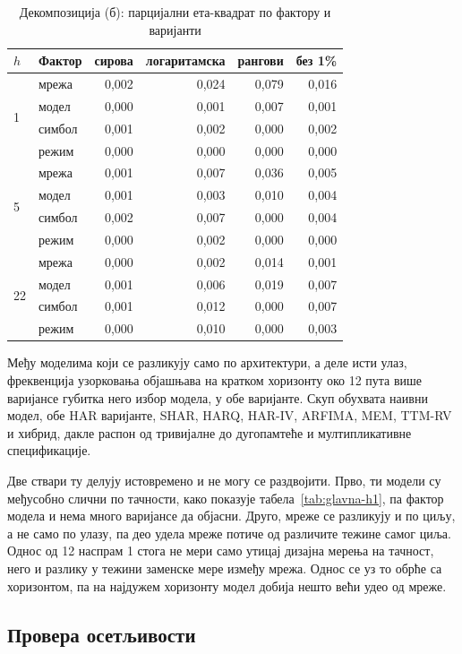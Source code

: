 \begin{table}[htbp]
\centering
\caption{Декомпозиција (б): парцијални ета-квадрат по фактору и варијанти}
\label{tab:anova-b}
\begin{tabular}{llrrrr}
\toprule
$h$ & Фактор & сирова & логаритамска & рангови & без 1\% \\
\midrule
\multirow{4}{*}{1}
& мрежа  & 0,002 & 0,024 & 0,079 & 0,016 \\
& модел  & 0,000 & 0,001 & 0,007 & 0,001 \\
& симбол & 0,001 & 0,002 & 0,000 & 0,002 \\
& режим  & 0,000 & 0,000 & 0,000 & 0,000 \\
\midrule
\multirow{4}{*}{5}
& мрежа  & 0,001 & 0,007 & 0,036 & 0,005 \\
& модел  & 0,001 & 0,003 & 0,010 & 0,004 \\
& симбол & 0,002 & 0,007 & 0,000 & 0,004 \\
& режим  & 0,000 & 0,002 & 0,000 & 0,000 \\
\midrule
\multirow{4}{*}{22}
& мрежа  & 0,000 & 0,002 & 0,014 & 0,001 \\
& модел  & 0,001 & 0,006 & 0,019 & 0,007 \\
& симбол & 0,001 & 0,012 & 0,000 & 0,007 \\
& режим  & 0,000 & 0,010 & 0,000 & 0,003 \\
\bottomrule
\end{tabular}
\end{table}

Међу моделима који се разликују само по архитектури, а деле исти улаз, фреквенција
узорковања објашњава на кратком хоризонту око 12 пута више варијансе губитка него
избор модела, у обе варијанте. Скуп обухвата наивни модел, обе HAR варијанте, SHAR,
HARQ, HAR-IV, ARFIMA, MEM, TTM-RV и хибрид, дакле распон од тривијалне до дугопамтеће и
мултипликативне спецификације.

Две ствари ту делују истовремено и не могу се раздвојити. Прво, ти модели су међусобно
слични по тачности, како показује табела~\ref{tab:glavna-h1}, па фактор модела и нема
много варијансе да објасни. Друго, мреже се разликују и по циљу, а не само по улазу, па
део удела мреже потиче од различите тежине самог циља. Однос од 12 наспрам 1
стога не мери само утицај дизајна мерења на тачност, него и разлику у тежини заменске мере
између мрежа. Однос се уз то обрће са хоризонтом, па на најдужем хоризонту модел добија
нешто већи удео од мреже.

\subsection{Провера осетљивости}
\label{subsec:osetljivost}


